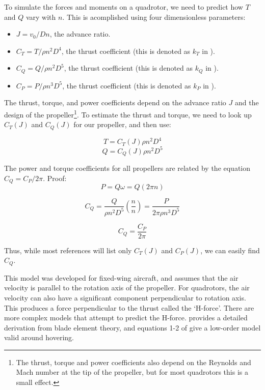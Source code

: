 \documentclass[12pt]{article}
\begin{document}
To simulate the forces and moments on a quadrotor, we need to predict how $T$ and $Q$ vary with $n$. This is acomplished using four dimensionless parameters:

\begin{itemize}
    \item $J = v_0 / D n$, the advance ratio.
    \item $C_T = T / \rho n^2 D^4$, the thrust coefficient (this is denoted as $k_T$ in \cite{Unified}).
    \item $C_Q = Q / \rho n^2 D^5$, the thrust coefficient (this is denoted as $k_Q$ in \cite{Unified}).
    \item $C_P = P / \rho n^3 D^5$, the thrust coefficient (this is denoted as $k_P$ in \cite{Unified}).
\end{itemize}

The thrust, torque, and power coefficients depend on the advance ratio $J$ and the design of the propeller\footnote{The thrust, torque and power coefficients also depend on the Reynolds and Mach number at the tip of the propeller, but for most quadrotors this is a small effect.}. To estimate the thrust and torque, we need to look up $C_T(J)$ and $C_Q(J)$ for our propeller, and then use:

\begin{equation}
    T = C_T(J) \rho n^2 D^4
\end{equation}
\begin{equation}
    Q = C_Q(J) \rho n^2 D^5
\end{equation}


The power and torque coefficients for all propellers are related by the equation $C_Q = C_P / 2 \pi$. Proof:
\[
P = Q \omega = Q (2 \pi n)
\]

\[
C_Q = \frac{Q}{\rho n^2 D^5} \left( \frac{n}{n} \right) = \frac{P}{2 \pi \rho n^3 D^5}
\]

\begin{equation}
C_Q =  \frac{C_P}{2 \pi}
\end{equation}

Thus, while most references will list only $C_T(J)$ and $C_P(J)$, we can easily find $C_Q$.

This model was developed for fixed-wing aircraft, and assumes that the air velocity is parallel to the rotation axis of the propeller. For quadrotors, the air velocity can also have a significant component perpendicular to rotation axis. This produces a force perpendicular to the thrust called the `H-force'. There are more complex models that attempt to predict the H-force. \cite{2016arXiv160100733B} provides a detailed derivation from blade element theory, and equations 1-2 of \cite{martin:hal-00422423} give a low-order model valid around hovering.
\end{document}
